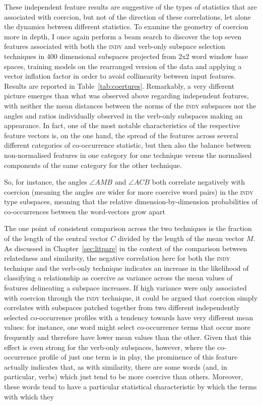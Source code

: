 These independent feature results are suggestive of the types of statistics that are associated with coercion, but not of the direction of these correlations, let alone the dynamics between different statistics.  To examine the geometry of coercion more in depth, I once again perform a beam search to discover the top seven features associated with both the \textsc{indy} and verb-only subspace selection techniques in 400 dimensional subspaces projected from 2x2 word window base spaces, training models on the rearranged version of the data and applying a vector inflation factor in order to avoid collinearity between input features.  Results are reported in Table~\ref{tab:coertures}.  Remarkably, a very different picture emerges than what was observed above regarding independent features, with neither the mean distances between the norms of the \textsc{indy} subspaces nor the angles and ratios individually observed in the verb-only subspaces making an appearance.  In fact, one of the most notable characteristics of the respective feature vectors is, on the one hand, the spread of the features across several different categories of co-occurrence statistic, but then also the balance between non-normalised features in one category for one technique versus the normalised components of the same category for the other technique.

So, for instance, the angles $\angle AMB$ and $\angle ACB$ both correlate negatively with coercion (meaning the angles are wider for more coercive word pairs) in the \textsc{indy} type subspaces, meaning that the relative dimension-by-dimension probabilities of co-occurrences between the word-vectors grow apart

The one point of consistent comparison across the two techniques is the fraction of the length of the central vector $C$ divided by the length of the mean vector $M$.  As discussed in Chapter~\ref{sec:litpare} in the context of the comparison between relatedness and similarity, the negative correlation here for both the \textsc{indy} technique and the verb-only technique indicates an increase in the likelihood of classifying a relationship as coercive as variance across the mean values of features delineating a subspace increases.  If high variance were only associated with coercion through the \textsc{indy} technique, it could be argued that coercion simply correlates with subspaces patched together from two different independently selected co-occurrence profiles with a tendency towards have very different mean values: for instance, one word might select co-occurrence terms that occur more frequently and therefore have lower mean values than the other.  Given that this effect is even strong for the verb-only subspaces, however, where the co-occurrence profile of just one term is in play, the prominence of this feature actually indicates that, as with similarity, there are some words (and, in particular, verbs) which just tend to be more coercive than others.  Moreover, these words tend to have a particular statistical characteristic by which the terms with which they 


